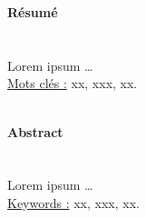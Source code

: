 \thispagestyle{empty}

\setlength{\parindent}{24pt}
\setlength{\topmargin}{50mm}

\setlength{\headheight}{0cm} 
\setlength{\headsep}{0cm}
\setlength{\textheight}{28cm}
\setlength{\textwidth}{15cm} 
\setlength{\marginparsep}{0cm} 
\setlength{\marginparwidth}{0cm}
\setlength{\headheight}{0cm} 
\setlength{\footskip}{0cm}

\begin{minipage}[c]{\textwidth}
\textbf{Résumé}
\\\\
\footnotesize
\paragraph{} Lorem ipsum \ldots \\
\underline{Mots clés :} xx, xxx, xx.
\end{minipage}
\\[1.5cm]

\textbf{Abstract}
\\\\

\begin{minipage}[c]{\textwidth}
\footnotesize

\paragraph{}Lorem ipsum \ldots \\

\underline{Keywords :} xx, xxx, xx.
\end{minipage}



